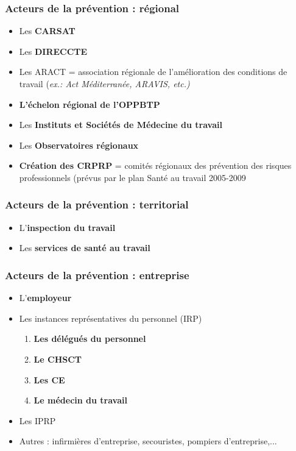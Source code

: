 \documentclass{beamer}
\begin{document}
\begin{frame}
\frametitle{Acteurs de la prévention : régional}

\begin{itemize}
\item Les \textbf{CARSAT}

\item Les \textbf{DIRECCTE} 

\item Les ARACT = association régionale  de l’amélioration des conditions de travail (\textit{ex.: Act Méditerranée, ARAVIS, etc.)}

\item \textbf{L’échelon régional de l’OPPBTP}

\item Les \textbf{Instituts et Sociétés de Médecine du travail}

\item Les \textbf{Observatoires régionaux}

\item \textbf{Création des CRPRP} = comités régionaux des prévention des risques professionnels (prévus par le plan Santé au travail 2005-2009 
\end{itemize}
\end{frame} 

\begin{frame}
\frametitle{Acteurs de la prévention : territorial}
\begin{itemize}
\item L’\textbf{inspection du travail}

\item Les \textbf{services de santé au travail}
\end{itemize}
\end{frame} 

\begin{frame}
\frametitle{Acteurs de la prévention : entreprise}
\begin{itemize}
\item L’\textbf{employeur}

\item Les instances représentatives du personnel (IRP)


\begin{enumerate}
        \item \textbf{Les délégués du personnel}
        \item \textbf{Le CHSCT}
        \item \textbf{Les CE}
        \item \textbf{Le médecin du travail}
\end{enumerate}
\item Les IPRP

\item Autres : infirmières d’entreprise, secouristes, pompiers d’entreprise,...
\end{itemize}
\end{frame} 
\end{document}
